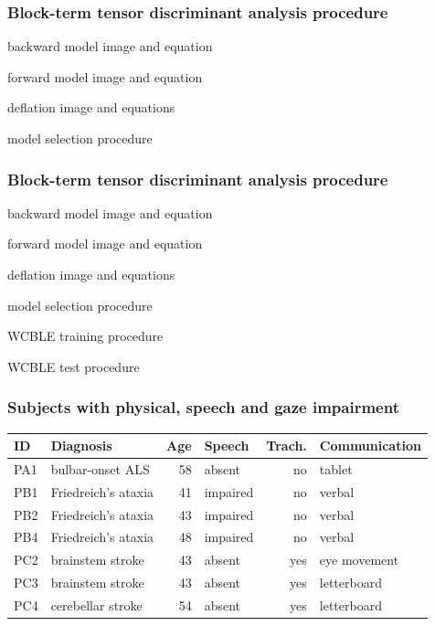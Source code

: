 \documentclass{kul-ulille-beamer}
\begin{document}
\begin{frame}[noframenumbering]

  \frametitle{Block-term tensor discriminant analysis procedure}
  backward model image and equation

  forward model image and equation

  deflation image and equations

  model selection procedure
\end{frame}

\begin{frame}[noframenumbering]

  \frametitle{Block-term tensor discriminant analysis procedure}
  backward model image and equation

  forward model image and equation

  deflation image and equations

  model selection procedure
\end{frame}

\begin{frame}[noframenumbering]
 WCBLE training procedure
\end{frame}

\begin{frame}[noframenumbering]
  WCBLE test procedure
\end{frame}

\begin{frame}[noframenumbering]
  \frametitle{Subjects with physical, speech and gaze impairment}

  \begin{tabular}{@{}l|lrlrl@{}}
      \textbf{ID}  & \textbf{Diagnosis} & \textbf{Age} &
      \textbf{Speech} & \textbf{Trach.} & \textbf{Communication} \\ \hline
      PA1 & bulbar-onset ALS & 58  & absent  & no          & tablet                 \\
      PB1 & Friedreich's ataxia & 41  & impaired & no          & verbal                 \\
      PB2 & Friedreich's ataxia & 43  & impaired & no          & verbal                 \\
      PB4 & Friedreich's ataxia & 48  & impaired & no          & verbal                 \\
      PC2 & brainstem stroke & 43  & absent  & yes         &  eye movement \\
      PC3 & brainstem stroke & 43  & absent  & yes         & letterboard            \\
      PC4 & cerebellar stroke & 54  & absent  & yes         & letterboard \\
  \end{tabular}

\end{frame}
\end{document}
